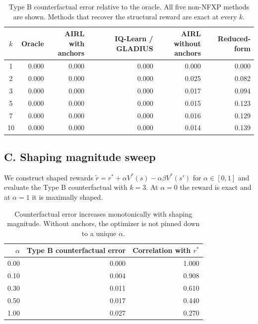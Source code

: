\documentclass[11pt]{article}
\begin{document}
\begin{table}[H]
\centering
\small
\setlength{\tabcolsep}{5pt}
\begin{tabular}{crrrrr}
\toprule
$k$ & Oracle & \shortstack{AIRL with\\ anchors} & IQ-Learn / GLADIUS & \shortstack{AIRL without\\ anchors} & Reduced-form \\
\midrule
1  & 0.000 & 0.000 & 0.000 & 0.000 & 0.000 \\
2  & 0.000 & 0.000 & 0.000 & 0.025 & 0.082 \\
3  & 0.000 & 0.000 & 0.000 & 0.017 & 0.094 \\
5  & 0.000 & 0.000 & 0.000 & 0.015 & 0.123 \\
7  & 0.000 & 0.000 & 0.000 & 0.016 & 0.129 \\
10 & 0.000 & 0.000 & 0.000 & 0.014 & 0.139 \\
\bottomrule
\end{tabular}
\caption{Type B counterfactual error relative to the oracle. All five non-NFXP methods are shown. Methods that recover the structural reward are exact at every $k$.}
\label{tab:type2}
\end{table}

\subsection{C. Shaping magnitude sweep}

We construct shaped rewards $\tilde{r} = r^* + \alpha V^*(s) - \alpha\beta V^*(s')$ for $\alpha \in [0,1]$ and evaluate the Type B counterfactual with $k=3$. At $\alpha = 0$ the reward is exact and at $\alpha = 1$ it is maximally shaped.

\begin{table}[H]
\centering
\begin{tabular}{rrr}
\toprule
$\alpha$ & Type B counterfactual error & Correlation with $r^*$ \\
\midrule
0.00 & 0.000 & 1.000 \\
0.10 & 0.004 & 0.908 \\
0.30 & 0.011 & 0.610 \\
0.50 & 0.017 & 0.440 \\
1.00 & 0.027 & 0.270 \\
\bottomrule
\end{tabular}
\caption{Counterfactual error increases monotonically with shaping magnitude. Without anchors, the optimizer is not pinned down to a unique $\alpha$.}
\label{tab:shaping}
\end{table}
\end{document}
